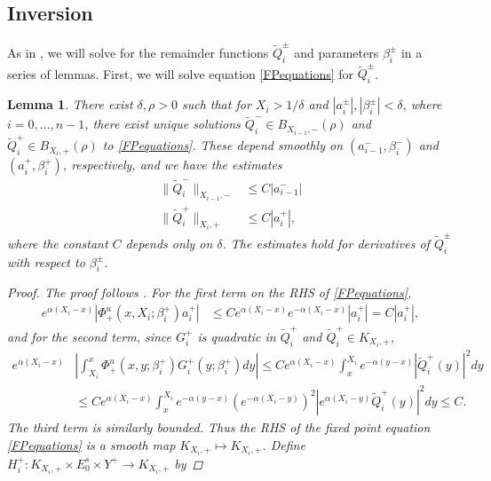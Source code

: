 \documentclass[12pt]{elsarticle}
\theoremstyle{plain}
\newtheorem{lemma}[theorem]{Lemma}
\theoremstyle{definition}
\theoremstyle{remark}
\numberwithin{theorem}{section}
\numberwithin{equation}{section}
\begin{document}
\subsection{Inversion}

As in \cite{Sandstede1997}, we will solve for the remainder functions $\tilde{Q}_i^\pm$ and parameters $\beta_i^\pm$ in a series of lemmas. First, we will solve equation \cref{FPequations} for $\tilde{Q}_i^\pm$.

\begin{lemma}\label{solveforV}
There exist $\delta, \rho > 0$ such that for $X_i > 1/\delta$ and $|a_i^\pm|, |\beta_i^\pm| < \delta$, where $i = 0, \dots, n-1$, there exist unique solutions $\tilde{Q}_i^- \in B_{X_{i-1}, -}(\rho)$ and $\tilde{Q}_i^+ \in B_{X_i, +}(\rho)$ to \cref{FPequations}. These depend smoothly on $(a_{i-1}^-, \beta_i^-)$ and $(a_i^+, \beta_i^+)$, respectively, and we have the estimates
\begin{equation}\label{Vest}
\begin{aligned}
\|\tilde{Q}_i^-\|_{X_{i-1}, -} &\leq C |a_{i-1}^-| \\
\|\tilde{Q}_i^+\|_{X_i, +} &\leq C |a_i^+|,
\end{aligned}
\end{equation}
where the constant $C$ depends only on $\delta$. The estimates hold for derivatives of $\tilde{Q}_i^\pm$ with respect to $\beta_i^\pm$.
\begin{proof}
The proof follows \cite[Lemma 5.2]{Sandstede1997}. For the first term on the RHS of \cref{FPequations},
\begin{align*}
e^{\alpha(X_i - x)} | \Phi^u_+(x, X_i; \beta_i^+) a_i^+ | 
&\leq C e^{\alpha(X_i - x)} e^{-\alpha(X_i - x)} |a_i^+| = C |a_i^+|,
\end{align*}
and for the second term, since $G_i^+$ is quadratic in $\tilde{Q}_i^+$ and $\tilde{Q}_i^+ \in K_{X_i, +}$, 
\begin{align*}
e^{\alpha(X_i - x)} &\left| \int_{X_i}^x \Phi_+^u(x, y; \beta_i^+) G_i^+(y; \beta_i^+)dy  \right| 
\leq C e^{\alpha(X_i - x)} \int_x^{X_i} e^{-\alpha(y - x)}|\tilde{Q}_i^+(y)|^2 dy \\
&\leq C e^{\alpha(X_i - x)} \int_x^{X_i} 
e^{-\alpha(y - x)}(e^{-\alpha(X_i - y)})^2|e^{\alpha(X_i - y)} \tilde{Q}_i^+(y)|^2 dy \leq C.
\end{align*}
The third term is similarly bounded. Thus the RHS of the fixed point equation \cref{FPequations} is a smooth map $K_{X_i, +} \mapsto K_{X_i, +}$. Define $H_i^+: K_{X_i, +} \times E_0^s \times Y^+ \rightarrow K_{X_i, +}$ by

\end{proof}
\end{lemma}
\end{document}
